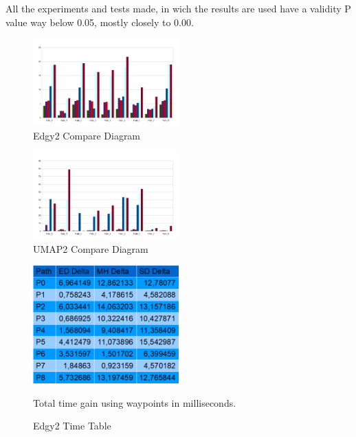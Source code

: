 \documentclass[sigconf]{acmart}
\begin{document}
All the experiments and tests made, in wich the results are used have a validity P value way below 0.05, mostly closely to 0.00.
\begin{figure}[h!]
\centering
\includegraphics[width=0.5\textwidth,height=\textheight,keepaspectratio]{ChartsAndFigures/Edgy2_d2.png}
\caption{Edgy2 Compare Diagram}
\label{fig:Edgy2_d2}
\end{figure}
\begin{figure}[h!]
\centering
\includegraphics[width=0.5\textwidth,height=\textheight,keepaspectratio]{ChartsAndFigures/UMAP2_d2.png}
\caption{UMAP2 Compare Diagram}
\label{fig:UMAP2_d2}
\end{figure}
\begin{figure}[h!]
\centering
\includegraphics[width=0.5\textwidth,height=\textheight,keepaspectratio]{ChartsAndFigures/Edgy2_timeTable.png}
\caption{Edgy2 Time Table}
Total time gain using waypoints in milliseconds.
\label{fig:Edgy2_cd}
\end{figure}
\end{document}
